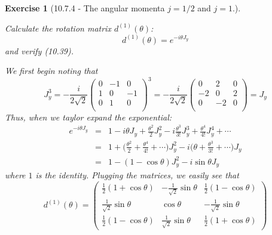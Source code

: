 \documentclass[12pt]{article}
\def\be{\begin{equation}}
\def\ee{\end{equation}}
\def\bea{\begin{eqnarray*}}
\def\eea{\end{eqnarray*}}
\def\f{\frac}
\newtheorem{exercise}{Exercise}
\begin{document}
\begin{exercise}[10.7.4 - The angular momenta $j=1/2$ and $j = 1$.]
\begin{exercises}
			\item Calculate the rotation matrix $d^{(1)}(\theta)$:
			\be
				d^{(1)}(\theta) = e^{-i\theta J_y}
			\ee
			and verify (10.39).
			\begin{multianswer}[true]
				We first begin noting that
				\be
					J_y^3 = -\f{i}{2\sqrt{2}}
					\begin{pmatrix}
						0 & -1 & 0 \\
						1 & 0 & -1 \\
						0 & 1 & 0 \\
					\end{pmatrix}^3 = -\f{i}{2\sqrt{2}}
					\begin{pmatrix}
						0 & 2 & 0 \\
						-2 & 0 & 2 \\
						0 & -2 & 0 \\
					\end{pmatrix} = J_y
				\ee
				Thus, when we taylor expand the exponential:
				\bea
					e^{-i\theta J_y} &=& 1 -i\theta J_y +\f{\theta^2}{2}J_y^2 -i\f{\theta^3}{3!}J_y^3 + \f{\theta^4}{4!}J_y^4 + \cdots \\
						&=& 1 + \Big( \f{\theta^2}{2} + \f{\theta^4}{4!} + \cdots \Big)J_y^2 - i\Big( \theta + \f{\theta^3}{3!} + \cdots \Big)J_y \\
						&=& 1 -(1-\cos\theta)J_y^2 -i\sin\theta J_y
				\eea
				where $1$ is the identity. Plugging the matrices, we easily see that
				\be
					d^{(1)}(\theta)=\left(\begin{array}{ccc}
						\frac{1}{2}(1+\cos \theta) & -\frac{1}{\sqrt{2}} \sin \theta & \frac{1}{2}(1-\cos \theta) \\
						\frac{1}{\sqrt{2}} \sin \theta & \cos \theta & -\frac{1}{\sqrt{2}} \sin \theta \\
						\frac{1}{2}(1-\cos \theta) & \frac{1}{\sqrt{2}} \sin \theta & \frac{1}{2}(1+\cos \theta)
					\end{array}\right)	
				\ee
			\end{multianswer}
			
		\end{exercises}
		
		
	\end{exercise}
	
	
\end{document}
